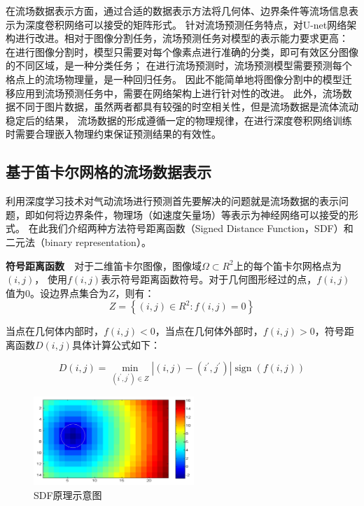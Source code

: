 在流场数据表示方面，通过合适的数据表示方法将几何体、边界条件等流场信息表示为深度卷积网络可以接受的矩阵形式。
针对流场预测任务特点，对U-net网络架构进行改进。相对于图像分割任务，流场预测任务对模型的表示能力要求更高：
在进行图像分割时，模型只需要对每个像素点进行准确的分类，即可有效区分图像的不同区域，是一种分类任务；
在进行流场预测时，流场预测模型需要预测每个格点上的流场物理量，是一种回归任务。
因此不能简单地将图像分割中的模型迁移应用到流场预测任务中，需要在网络架构上进行针对性的改进。
此外，流场数据不同于图片数据，虽然两者都具有较强的时空相关性，但是流场数据是流体流动稳定后的结果，
流场数据的形成遵循一定的物理规律，在进行深度卷积网络训练时需要合理嵌入物理约束保证预测结果的有效性。



\subsection{基于笛卡尔网格的流场数据表示}
利用深度学习技术对气动流场进行预测首先要解决的问题就是流场数据的表示问题，即如何将边界条件，物理场（如速度矢量场）等表示为神经网络可以接受的形式。
在此我们介绍两种方法符号距离函数（Signed Distance Function，SDF）和二元法（binary representation）。


\textbf{符号距离函数}~~对于二维笛卡尔图像，图像域$\Omega \subset R^{2}$上的每个笛卡尔网格点为$(i, j)$，
使用$f(i, j)$表示符号距离函数符号。对于几何图形经过的点，$f(i, j)$值为0。设边界点集合为$Z$，则有：
\begin{equation}Z=\left\{(i, j) \in R^{2}: f(i, j)=0\right\}\end{equation}

当点在几何体内部时，$f(i, j) < 0$，当点在几何体外部时，$f(i, j) > 0$，符号距离函数$D(i, j)$具体计算公式如下：

\begin{equation}
D(i, j)=\min _{\left(i^{\prime}, j^{\prime}\right) \in Z}\left|(i, j)-\left(i^{\prime}, j^{\prime}\right)\right| \operatorname{sign}(f(i, j))
\end{equation}


\begin{figure}[htp]
	\centering
	\includegraphics[width=0.54\textwidth]{figures/sdf.png}
	\caption{SDF原理示意图}
	\label{fig:sdf}
\end{figure}

